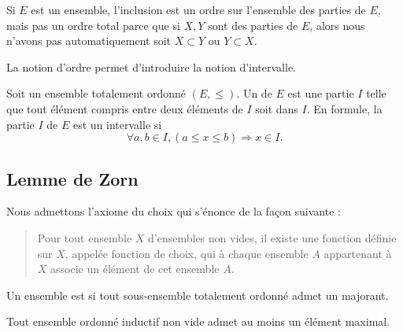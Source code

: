 \begin{example}
    Si \( E\) est un ensemble, l'inclusion est un ordre sur l'ensemble des parties de \( E\), mais pas un ordre total parce que si \( X,Y\) sont des parties de \( E\), alors nous n'avons pas automatiquement soit \( X\subset Y\) ou \( Y\subset X\).
\end{example}

La notion d'ordre permet d'introduire la notion d'intervalle.

\begin{definition}  \label{DefEYAooMYYTz}
    Soit un ensemble totalement ordonné \( (E,\leq)\). Un  de \( E\) est une partie \( I\) telle que tout élément compris entre deux éléments de \( I \) soit dans \( I \). En formule, la partie \( I \) de \( E\) est un intervalle si
    \[
      \forall a,b\in I,(a\leq x\leq b)\Rightarrow x\in I.
    \]
\end{definition}

\subsection{Lemme de Zorn}

Nous admettons l'axiome du choix\cite{BIBooBZJMooJDJRgg} qui s'énonce de la façon suivante\cite{BIBooTQMWooFFAQQZ} :
\begin{quote}
    Pour tout ensemble $X$ d'ensembles non vides, il existe une fonction définie sur $X$, appelée fonction de choix, qui à chaque ensemble $A$ appartenant à $X$ associe un élément de cet ensemble $A$.
\end{quote}

\begin{definition}  \label{DefGHDfyyz}
    Un ensemble est  si tout sous-ensemble totalement ordonné admet un majorant.
\end{definition}


\begin{lemma}    \label{LemUEGjJBc}
    Tout ensemble ordonné inductif non vide admet au moins un élément maximal.
\end{lemma}


